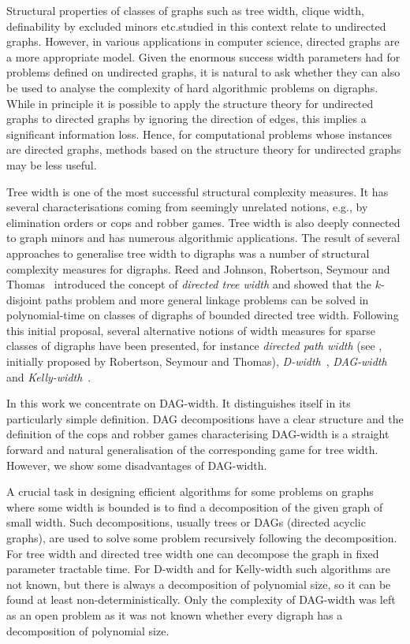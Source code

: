 \documentclass[authoryear]{article}
\theoremstyle{definition}
\newcommand{\0}{\emptyset}
\newcommand{\tw}{tree {}width\xspace}
\newcommand{\Tw}{Tree {}width\xspace}
\newcommand{\dtw}{directed tree {}width\xspace}
\newcommand{\dagw}{DAG-{}width\xspace}
\newcommand{\kw}{Kelly-{}width\xspace}
\newcommand{\dw}{D-{}width\xspace}
\newcommand{\eg}{e.g.,\xspace}
\begin{document}
Structural properties of classes of graphs such as tree width, clique
width, definability by excluded minors etc.\@ studied in this context relate to
undirected graphs.
However, in various applications in computer science, directed graphs are
a more appropriate model. 
Given the enormous success
width parameters 
had for problems defined on undirected graphs, it is natural to ask
whether they can also be used to analyse the complexity of hard
algorithmic problems
on digraphs.
While in principle it is 
possible to apply the structure theory for undirected graphs to directed
graphs by ignoring the direction of edges, this implies a significant
information loss. Hence,
for computational problems whose instances are directed graphs,  
methods based on the structure theory for undirected graphs may be
less useful.

\Tw is one of the most successful structural complexity measures. It has several
characterisations coming from seemingly unrelated notions, \eg by
elimination orders or cops and robber games. \Tw is also deeply
connected to graph minors and has numerous algorithmic applications.
The result of several approaches to generalise \tw to digraphs was a
number of structural complexity measures for digraphs. 
Reed \cite{Reed99} and Johnson, Robertson, Seymour and
Thomas~\cite{JohnsonRobSeyTho01} introduced the
concept of \emph{directed tree width} and showed that the $k$-disjoint
paths problem and more general linkage problems can be solved in
polynomial-time on classes of digraphs of bounded directed
tree width. Following this initial proposal, several alternative
notions of width measures for sparse classes of digraphs have been
presented, for instance \emph{directed path width} (see
\cite{Barat06}, initially proposed by Robertson, Seymour and Thomas),
\emph{D-width}~\cite{Safari05},
\emph{DAG-width}~\cite{BerwangerDawHunKreObd12} and
\emph{Kelly-width}~\cite{HunterKre08}. 

In this work we concentrate on \dagw. It distinguishes itself in its
particularly simple definition. DAG decompositions have a clear
structure and the definition of the cops and robber games
characterising \dagw is a straight forward and natural generalisation
of the corresponding game for \tw. However, we show some disadvantages
of \dagw.






A crucial task in designing efficient algorithms for some problems on graphs where some
width is bounded is to find a decomposition of the given graph of
small width. Such decompositions, usually trees or DAGs (directed acyclic graphs), are used to
solve some problem recursively following the decomposition. For \tw and
\dtw one can decompose the graph in fixed parameter tractable
time. For \dw and for \kw such algorithms are not known, but there is
always a decomposition of polynomial size, so it can be found at least
 non-deterministically. 
Only the complexity of \dagw was left as an open problem
as it was not known whether every digraph has a decomposition of
polynomial size.
\end{document}
